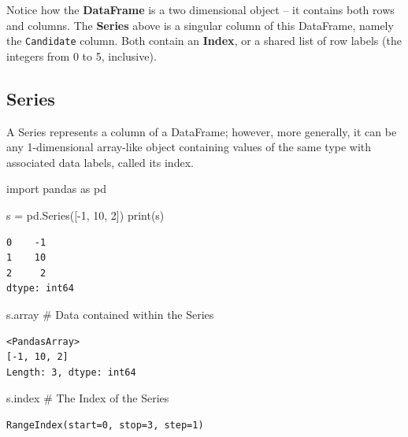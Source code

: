 \documentclass[
  letterpaper,
  DIV=11,
  numbers=noendperiod]{scrreprt}
\newenvironment{Shaded}{\begin{snugshade}}{\end{snugshade}}
\newcommand{\BuiltInTok}[1]{\textcolor[rgb]{0.00,0.23,0.31}{#1}}
\newcommand{\CommentTok}[1]{\textcolor[rgb]{0.37,0.37,0.37}{#1}}
\newcommand{\DecValTok}[1]{\textcolor[rgb]{0.68,0.00,0.00}{#1}}
\newcommand{\ImportTok}[1]{\textcolor[rgb]{0.00,0.46,0.62}{#1}}
\newcommand{\NormalTok}[1]{\textcolor[rgb]{0.00,0.23,0.31}{#1}}
\newcommand{\OperatorTok}[1]{\textcolor[rgb]{0.37,0.37,0.37}{#1}}
\begin{document}
Notice how the \textbf{DataFrame} is a two dimensional object -- it
contains both rows and columns. The \textbf{Series} above is a singular
column of this DataFrame, namely the \texttt{Candidate} column. Both
contain an \textbf{Index}, or a shared list of row labels (the integers
from 0 to 5, inclusive).

\hypertarget{series}{%
\subsection{Series}\label{series}}

A Series represents a column of a DataFrame; however, more generally, it
can be any 1-dimensional array-like object containing values of the same
type with associated data labels, called its index.

\begin{Shaded}
\begin{Highlighting}[]
\ImportTok{import}\NormalTok{ pandas }\ImportTok{as}\NormalTok{ pd}

\NormalTok{s }\OperatorTok{=}\NormalTok{ pd.Series([}\OperatorTok{{-}}\DecValTok{1}\NormalTok{, }\DecValTok{10}\NormalTok{, }\DecValTok{2}\NormalTok{])}
\BuiltInTok{print}\NormalTok{(s)}
\end{Highlighting}
\end{Shaded}

\begin{verbatim}
0    -1
1    10
2     2
dtype: int64
\end{verbatim}

\begin{Shaded}
\begin{Highlighting}[]
\NormalTok{s.array }\CommentTok{\# Data contained within the Series}
\end{Highlighting}
\end{Shaded}

\begin{verbatim}
<PandasArray>
[-1, 10, 2]
Length: 3, dtype: int64
\end{verbatim}

\begin{Shaded}
\begin{Highlighting}[]
\NormalTok{s.index }\CommentTok{\# The Index of the Series}
\end{Highlighting}
\end{Shaded}

\begin{verbatim}
RangeIndex(start=0, stop=3, step=1)
\end{verbatim}
\end{document}
